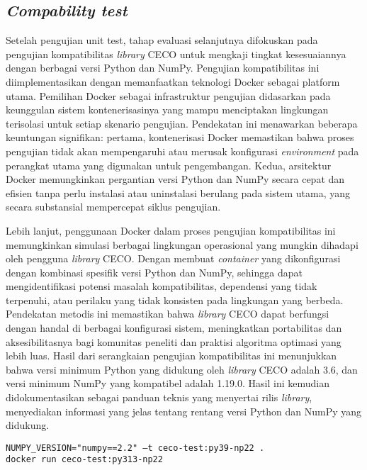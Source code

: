 \subsection{\textit{Compability test}}
Setelah pengujian unit test, tahap evaluasi selanjutnya difokuskan pada pengujian kompatibilitas \textit{library} CECO untuk mengkaji tingkat kesesuaiannya dengan berbagai versi Python dan NumPy. Pengujian kompatibilitas ini diimplementasikan dengan memanfaatkan teknologi Docker sebagai platform utama. Pemilihan Docker sebagai infrastruktur pengujian didasarkan pada keunggulan sistem kontenerisasinya yang mampu menciptakan lingkungan terisolasi untuk setiap skenario pengujian. Pendekatan ini menawarkan beberapa keuntungan signifikan: pertama, kontenerisasi Docker memastikan bahwa proses pengujian tidak akan mempengaruhi atau merusak konfigurasi \textit{environment} pada perangkat utama yang digunakan untuk pengembangan. Kedua, arsitektur Docker memungkinkan pergantian versi Python dan NumPy secara cepat dan efisien tanpa perlu instalasi atau uninstalasi berulang pada sistem utama, yang secara substansial mempercepat siklus pengujian.

Lebih lanjut, penggunaan Docker dalam proses pengujian kompatibilitas ini memungkinkan simulasi berbagai lingkungan operasional yang mungkin dihadapi oleh pengguna \textit{library} CECO. Dengan membuat \textit{container} yang dikonfigurasi dengan kombinasi spesifik versi Python dan NumPy, sehingga dapat mengidentifikasi potensi masalah kompatibilitas, dependensi yang tidak terpenuhi, atau perilaku yang tidak konsisten pada lingkungan yang berbeda. Pendekatan metodis ini memastikan bahwa \textit{library} CECO dapat berfungsi dengan handal di berbagai konfigurasi sistem, meningkatkan portabilitas dan aksesibilitasnya bagi komunitas peneliti dan praktisi algoritma optimasi yang lebih luas. Hasil dari serangkaian pengujian kompatibilitas ini menunjukkan bahwa versi minimum Python yang didukung oleh \textit{library} CECO adalah 3.6, dan versi minimum NumPy yang kompatibel adalah 1.19.0. Hasil ini kemudian didokumentasikan sebagai panduan teknis yang menyertai rilis \textit{library}, menyediakan informasi yang jelas tentang rentang versi Python dan NumPy yang didukung.



\begin{lstlisting}[caption=Perintah untuk build dockerfile dan menjalankan container hasil build, label=lst:docker_build]
NUMPY_VERSION="numpy==2.2" –t ceco-test:py39-np22 .
docker run ceco-test:py313-np22
\end{lstlisting}